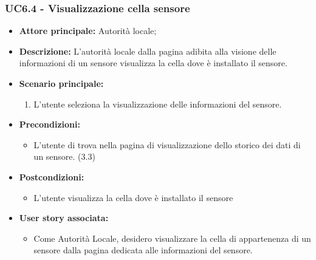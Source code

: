 \subsubsection{UC6.4 - Visualizzazione cella sensore}
\begin{itemize}
    \item \textbf{Attore principale:} Autorità locale;
    \item \textbf{Descrizione:} L’autorità locale dalla pagina adibita alla visione delle informazioni di un sensore visualizza la cella dove è installato il sensore.
    \item \textbf{Scenario principale:}
    \begin{enumerate}
        \item L'utente seleziona la visualizzazione delle informazioni del sensore.
    \end{enumerate}
\item \textbf{Precondizioni:}
    \begin{itemize}
        \item  L'utente di trova nella pagina di visualizzazione dello storico dei dati di un sensore. (3.3)
    \end{itemize}
    \item \textbf{Postcondizioni:}
          \begin{itemize}
              \item  L'utente visualizza la cella dove è installato il sensore
          \end{itemize}
    \item \textbf{User story associata:}
          \begin{itemize}
              \item Come Autorità Locale, desidero visualizzare la cella di appartenenza di un sensore dalla pagina dedicata alle informazioni del sensore.
          \end{itemize}
\end{itemize}